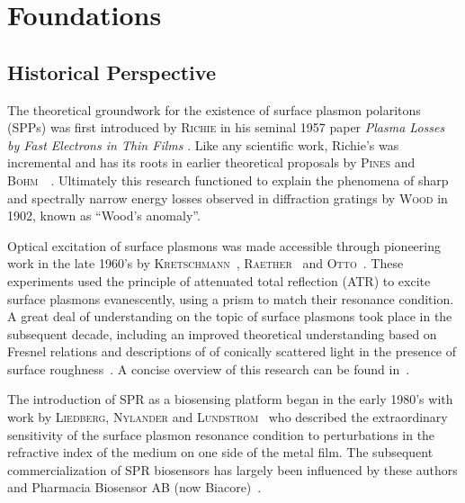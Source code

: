 \documentclass[a4paper,titlepage,onecolumn]{report}
\newcommand{\name}[1]{\textsc{#1}}
\begin{document}
\chapter{Foundations}
\label{ch:foundations}
\section{Historical Perspective}
The theoretical groundwork for the existence of surface plasmon polaritons
(SPPs) was first introduced by \name{Richie} in his seminal 1957 paper
\textit{Plasma Losses by Fast Electrons in Thin Films}
\cite{ritchie1957plasma}.  Like any scientific work, Richie's was
incremental and has its roots in earlier theoretical proposals by
\name{Pines} and
\name{Bohm}~\cite{bohm1951collective}~\cite{pines1952collective}.
Ultimately this research functioned to explain the phenomena of sharp and
spectrally narrow energy losses observed in diffraction gratings by
\name{Wood} in 1902, known as ``Wood's anomaly''.

Optical excitation of surface plasmons was made accessible through
pioneering work in the late 1960's by
\name{Kretschmann}~\cite{kretschmann1968},
\name{Raether}~\cite{raether1965springer} and
\name{Otto}~\cite{otto1968excitation}.  These experiments used the
principle of attenuated total reflection (ATR) to excite surface plasmons
evanescently, using a prism to match their resonance condition.  A great
deal of understanding on the topic of surface plasmons took place in the
subsequent decade, including an improved theoretical understanding based on
Fresnel relations \cite{chen1976excitation} and descriptions of of
conically scattered light in the presence of surface
roughness~\cite{simon1976directional}.  A concise overview of this research
can be found in~\cite{raether1997surface}.

The introduction of SPR as a biosensing platform began in the early 1980's
with work by \name{Liedberg}, \name{Nylander} and
\name{Lundstrom}~\cite{liedberg1983surface} who described the
extraordinary sensitivity of the surface plasmon resonance condition to
perturbations in the refractive index of the medium on one side of the
metal film.  The subsequent commercialization of SPR biosensors has largely
been influenced by these authors and Pharmacia Biosensor AB (now
Biacore)~\cite{liedberg1995biosensing}.
\end{document}

